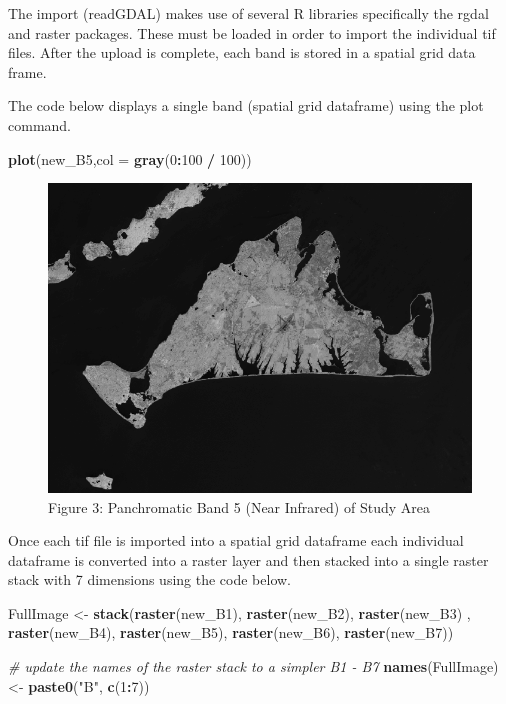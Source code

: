\documentclass[]{article}
\newenvironment{Shaded}{\begin{snugshade}}{\end{snugshade}}
\newcommand{\KeywordTok}[1]{\textcolor[rgb]{0.13,0.29,0.53}{\textbf{#1}}}
\newcommand{\DataTypeTok}[1]{\textcolor[rgb]{0.13,0.29,0.53}{#1}}
\newcommand{\DecValTok}[1]{\textcolor[rgb]{0.00,0.00,0.81}{#1}}
\newcommand{\StringTok}[1]{\textcolor[rgb]{0.31,0.60,0.02}{#1}}
\newcommand{\CommentTok}[1]{\textcolor[rgb]{0.56,0.35,0.01}{\textit{#1}}}
\newcommand{\OperatorTok}[1]{\textcolor[rgb]{0.81,0.36,0.00}{\textbf{#1}}}
\newcommand{\NormalTok}[1]{#1}
\begin{document}
The import (readGDAL) makes use of several R libraries specifically the
rgdal and raster packages. These must be loaded in order to import the
individual tif files. After the upload is complete, each band is stored
in a spatial grid data frame.

The code below displays a single band (spatial grid dataframe) using the
plot command.

\begin{Shaded}
\begin{Highlighting}[]
\KeywordTok{plot}\NormalTok{(new_B5,}\DataTypeTok{col =} \KeywordTok{gray}\NormalTok{(}\DecValTok{0}\OperatorTok{:}\DecValTok{100} \OperatorTok{/}\StringTok{ }\DecValTok{100}\NormalTok{))}
\end{Highlighting}
\end{Shaded}

\begin{figure}
\centering
\includegraphics{images/Band5.png}
\caption{Figure 3: Panchromatic Band 5 (Near Infrared) of Study Area}
\end{figure}

Once each tif file is imported into a spatial grid dataframe each
individual dataframe is converted into a raster layer and then stacked
into a single raster stack with 7 dimensions using the code below.

\begin{Shaded}
\begin{Highlighting}[]
\NormalTok{FullImage <-}\StringTok{ }\KeywordTok{stack}\NormalTok{(}\KeywordTok{raster}\NormalTok{(new_B1), }\KeywordTok{raster}\NormalTok{(new_B2), }\KeywordTok{raster}\NormalTok{(new_B3)}
\NormalTok{                   , }\KeywordTok{raster}\NormalTok{(new_B4), }\KeywordTok{raster}\NormalTok{(new_B5), }\KeywordTok{raster}\NormalTok{(new_B6), }
                   \KeywordTok{raster}\NormalTok{(new_B7))}

\CommentTok{# update the names of the raster stack to a simpler B1 - B7}
\KeywordTok{names}\NormalTok{(FullImage) <-}\StringTok{ }\KeywordTok{paste0}\NormalTok{(}\StringTok{"B"}\NormalTok{, }\KeywordTok{c}\NormalTok{(}\DecValTok{1}\OperatorTok{:}\DecValTok{7}\NormalTok{))}
\end{Highlighting}
\end{Shaded}
\end{document}
